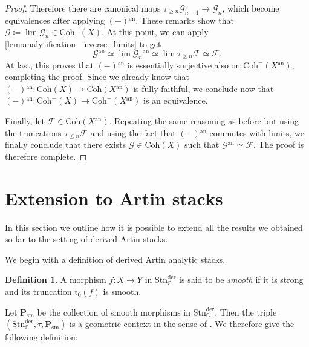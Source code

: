 \documentclass[12pt,a4paper,reqno]{amsart}
\theoremstyle{plain}
\theoremstyle{definition}
\newtheorem{defin}[thm]{Definition}
\theoremstyle{remark}
\numberwithin{equation}{section}
\begin{document}
\begin{proof}
	Therefore there are canonical maps $\tau_{\ge n} {\mathcal G}_{n-1} \to {\mathcal G}_n$, which become equivalences after applying $(-){^\mathrm{an}}$.
	These remarks show that ${\mathcal G} \coloneqq \lim {\mathcal G}_n \in {\mathrm{Coh}}^-(X)$.
	At this point, we can apply \cref{lem:analytification_inverse_limits} to get
	\[ {\mathcal G}{^\mathrm{an}} \simeq \lim {\mathcal G}_n{^\mathrm{an}} \simeq \lim \tau_{\ge n} {\mathcal F} \simeq {\mathcal F} . \]
	At last, this proves that $(-){^\mathrm{an}}$ is essentially surjective also on ${\mathrm{Coh}}^-(X{^\mathrm{an}})$, completing the proof.
	Since we already know that $(-){^\mathrm{an}} \colon {\mathrm{Coh}}(X) \to {\mathrm{Coh}}(X{^\mathrm{an}})$ is fully faithful, we conclude now that $(-){^\mathrm{an}} \colon {\mathrm{Coh}}^-(X) \to {\mathrm{Coh}}^-(X{^\mathrm{an}})$ is an equivalence.

	Finally, let ${\mathcal F} \in {\mathrm{Coh}}(X{^\mathrm{an}})$. Repeating the same reasoning as before but using the truncations $\tau_{\le n} {\mathcal F}$ and using the fact that $(-){^\mathrm{an}}$ commutes with limits, we finally conclude that there exists ${\mathcal G} \in {\mathrm{Coh}}(X)$ such that ${\mathcal G}{^\mathrm{an}} \simeq {\mathcal F}$.
	The proof is therefore complete.
\end{proof}

\section{Extension to Artin stacks} \label{sec:extension_Artin}

In this section we outline how it is possible to extend all the results we obtained so far to the setting of derived Artin stacks.

We begin with a definition of derived Artin analytic stacks.

\begin{defin}
	A morphism $f \colon X \to Y$ in ${\mathrm{Stn}^{\mathrm{der}}_{\mathbb C}}$ is said to be \emph{smooth} if it is strong and its truncation ${\mathrm{t}_0}(f)$ is smooth.
\end{defin}

Let $\mathbf P_{\mathrm{sm}}$ be the collection of smooth morphisms in ${\mathrm{Stn}^{\mathrm{der}}_{\mathbb C}}$.
Then the triple $({\mathrm{Stn}^{\mathrm{der}}_{\mathbb C}}, \tau, \mathbf P_{\mathrm{sm}})$ is a geometric context in the sense of \cite{Porta_Yu_Higher_analytic_stacks_2014}.
We therefore give the following definition:
\end{document}
